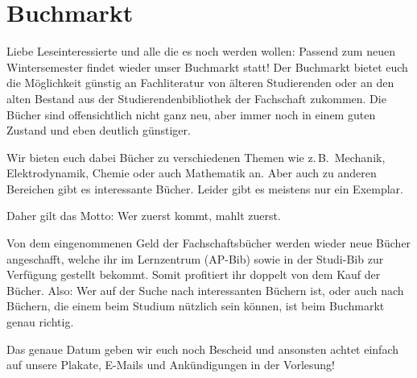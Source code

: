 \section{Buchmarkt}
\begin{multicols*}{2}
Liebe Leseinteressierte und alle die es noch werden wollen: Passend zum neuen Wintersemester findet wieder unser Buchmarkt statt! Der Buchmarkt bietet euch die Möglichkeit günstig an Fachliteratur von älteren Studierenden oder an den alten Bestand aus der Studierendenbibliothek der Fachschaft zukommen. Die Bücher sind offensichtlich nicht ganz neu, aber immer noch in einem guten Zustand und eben deutlich günstiger. 

Wir bieten euch dabei Bücher zu verschiedenen Themen wie z.\,B.\ Mechanik, Elektrodynamik, Chemie oder auch Mathematik an. Aber auch zu anderen Bereichen gibt es interessante Bücher. Leider gibt es meistens nur ein Exemplar.

Daher gilt das Motto: Wer zuerst kommt, mahlt zuerst. 

Von dem eingenommenen Geld der Fachschaftsbücher werden wieder neue Bücher angeschafft, welche ihr im Lernzentrum (AP-Bib) sowie in der Studi-Bib zur Verfügung gestellt bekommt. Somit profitiert ihr doppelt von dem Kauf der Bücher. Also: Wer auf der Suche nach interessanten Büchern ist, oder auch nach Büchern, die einem beim Studium nützlich sein können, ist beim Buchmarkt genau richtig.

Das genaue Datum geben wir euch noch Bescheid und ansonsten achtet einfach auf unsere Plakate, E-Mails und Ankündigungen in der Vorlesung!

\end{multicols*}

